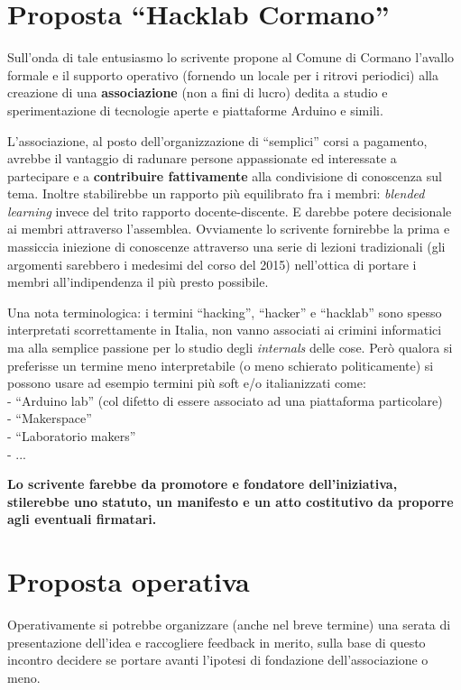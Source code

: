 \documentclass[a4paper,12pt]{article}
\begin{document}
\section*{Proposta ``Hacklab Cormano''}

Sull'onda di tale entusiasmo lo scrivente propone al Comune di Cormano l'avallo formale e il supporto operativo (fornendo un locale per i ritrovi periodici) alla creazione di una \textbf{associazione} (non a fini di lucro) dedita a studio e sperimentazione di tecnologie aperte e piattaforme Arduino e simili.

L'associazione, al posto dell'organizzazione di ``semplici'' corsi a pagamento, avrebbe il vantaggio di radunare persone appassionate ed interessate a partecipare e a \textbf{contribuire fattivamente} alla condivisione di conoscenza sul tema. Inoltre stabilirebbe un rapporto più equilibrato fra i membri: \textit{blended learning} invece del trito rapporto docente-discente. E darebbe potere decisionale ai membri attraverso l'assemblea.
Ovviamente lo scrivente fornirebbe la prima e massiccia iniezione di conoscenze attraverso una serie di lezioni tradizionali (gli argomenti sarebbero i medesimi del corso del 2015) nell'ottica di portare i membri all'indipendenza il più presto possibile.

Una nota terminologica: i termini ``hacking'', ``hacker'' e ``hacklab'' sono spesso interpretati scorrettamente in Italia, non vanno associati ai crimini informatici ma alla semplice passione per lo studio degli \textit{internals} delle cose.
Però qualora si preferisse un termine meno interpretabile (o meno schierato politicamente) si possono usare ad esempio termini più soft  e/o italianizzati come:\\
- ``Arduino lab'' (col difetto di essere associato ad una piattaforma particolare)\\
- ``Makerspace''\\
- ``Laboratorio makers''\\
- ...


\textbf{Lo scrivente farebbe da promotore e fondatore dell'iniziativa, stilerebbe uno statuto, un manifesto e un atto costitutivo da proporre agli eventuali firmatari.}

\section*{Proposta operativa}

Operativamente si potrebbe organizzare (anche nel breve termine) una serata di presentazione dell'idea e raccogliere feedback in merito, sulla base di questo incontro decidere se portare avanti l'ipotesi di fondazione dell'associazione o meno.
\end{document}
